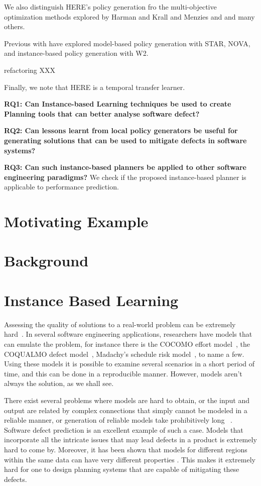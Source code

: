 \documentclass[conference]{IEEEtran}
\begin{document}
We also distinguish HERE's policy generation fro the multi-objective optimization methods explored by Harman and Krall and Menzies and 
and many others.



Previous with have explored model-based policy generation with STAR,
NOVA, and instance-based policy generation with  W2.

refactoring XXX

Finally, we note that HERE is a temporal transfer learner.


{\bf RQ1: Can Instance-based Learning techniques be used to create Planning tools that can better analyse software defect?} 


{\bf RQ2: Can lessons learnt from local policy generators be useful for generating solutions that can be used to mitigate defects in software systems?} 

{\bf RQ3: Can such instance-based planners be applied to other software engineering paradigms?}
We check if the proposed instance-based planner is applicable to performance prediction.

\section{Motivating Example}
\section{Background}
\section{Instance Based Learning}

Assessing the quality of solutions to a real-world problem can be extremely hard~\cite{menzies2005xomo}. In several software engineering applications, researchers have models that can emulate the problem, for instance there is the COCOMO effort model~\cite[p29-57]{boehm2009software}, the COQUALMO defect model~\cite[p254-268]{boehm2009software}, Madachy’s schedule risk model~\cite[p284-291]{boehm2009software}, to name a few. Using these models it is possible to examine several scenarios in a short period of time, and this can be done in a reproducible manner. However, models aren't always the solution, as we shall see. 

There exist several problems where models are hard to obtain, or the input and output are related by complex connections that simply cannot be modeled in a reliable manner, or generation of reliable models take prohibitively long ~\cite{Ludewig2003}. Software defect prediction is an excellent example of such a case. Models that incorporate all the intricate issues that may lead defects in a product is extremely hard to come by. Moreover, it has been shown that models for different regions within the same data can have very different properties \cite{localvsglobal}. This makes it extremely hard for one to design planning systems that are capable of mitigating these defects.
\end{document}
